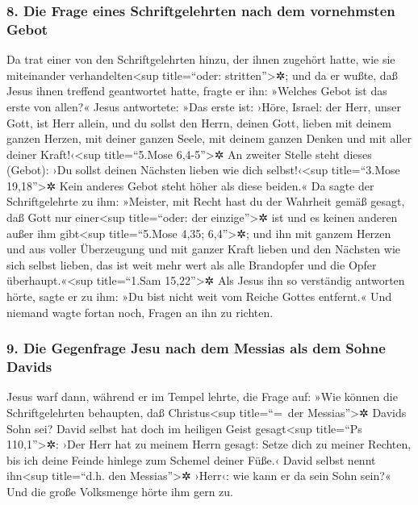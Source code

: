 \hypertarget{die-frage-eines-schriftgelehrten-nach-dem-vornehmsten-gebot}{%
\subsubsection{8. Die Frage eines Schriftgelehrten nach dem vornehmsten
Gebot}\label{die-frage-eines-schriftgelehrten-nach-dem-vornehmsten-gebot}}

 Da trat einer von den Schriftgelehrten hinzu, der ihnen
zugehört hatte, wie sie miteinander verhandelten\textless sup
title=``oder: stritten''\textgreater✲; und da er wußte, daß Jesus ihnen
treffend geantwortet hatte, fragte er ihn: »Welches Gebot ist das erste
von allen?«  Jesus antwortete: »Das erste ist: ›Höre,
Israel: der Herr, unser Gott, ist Herr allein,  und du
sollst den Herrn, deinen Gott, lieben mit deinem ganzen Herzen, mit
deiner ganzen Seele, mit deinem ganzen Denken und mit aller deiner
Kraft!‹\textless sup title=``5.Mose 6,4-5''\textgreater✲ 
An zweiter Stelle steht dieses (Gebot): ›Du sollst deinen Nächsten
lieben wie dich selbst!‹\textless sup title=``3.Mose
19,18''\textgreater✲ Kein anderes Gebot steht höher als diese beiden.«
 Da sagte der Schriftgelehrte zu ihm: »Meister, mit Recht
hast du der Wahrheit gemäß gesagt, daß Gott nur einer\textless sup
title=``oder: der einzige''\textgreater✲ ist und es keinen anderen außer
ihm gibt\textless sup title=``5.Mose 4,35; 6,4''\textgreater✲;
 und ihn mit ganzem Herzen und aus voller Überzeugung und
mit ganzer Kraft lieben und den Nächsten wie sich selbst lieben, das ist
weit mehr wert als alle Brandopfer und die Opfer
überhaupt.«\textless sup title=``1.Sam 15,22''\textgreater✲
 Als Jesus ihn so verständig antworten hörte, sagte er zu
ihm: »Du bist nicht weit vom Reiche Gottes entfernt.« Und niemand wagte
fortan noch, Fragen an ihn zu richten.

\hypertarget{die-gegenfrage-jesu-nach-dem-messias-als-dem-sohne-davids}{%
\subsubsection{9. Die Gegenfrage Jesu nach dem Messias als dem Sohne
Davids}\label{die-gegenfrage-jesu-nach-dem-messias-als-dem-sohne-davids}}

 Jesus warf dann, während er im Tempel lehrte, die Frage
auf: »Wie können die Schriftgelehrten behaupten, daß
Christus\textless sup title=``=~der Messias''\textgreater✲ Davids Sohn
sei?  David selbst hat doch im heiligen Geist
gesagt\textless sup title=``Ps 110,1''\textgreater✲: ›Der Herr hat zu
meinem Herrn gesagt: Setze dich zu meiner Rechten, bis ich deine Feinde
hinlege zum Schemel deiner Füße.‹  David selbst nennt
ihn\textless sup title=``d.h. den Messias''\textgreater✲ ›Herr‹: wie
kann er da sein Sohn sein?« Und die große Volksmenge hörte ihm gern zu.

